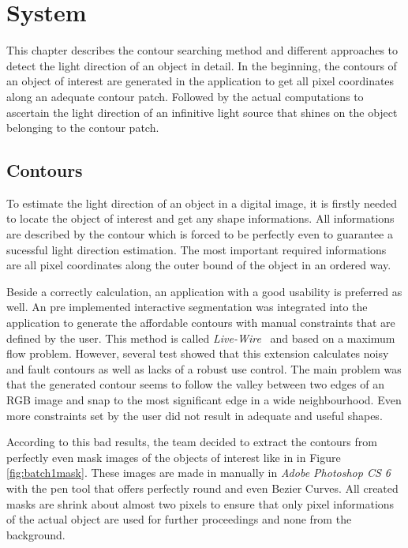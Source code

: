 \section{System}\label{sec:System}
This chapter describes the contour searching method and different approaches to detect the light direction of an object in detail. In the beginning, the contours of an object of interest are generated in the application to get all pixel coordinates along an adequate contour patch. Followed by the actual computations to ascertain the light direction of an infinitive light source that shines on the object belonging to the contour patch.

\subsection{Contours}\label{sec:contours}
To estimate the light direction of an object in a digital image, it is firstly needed to locate the object of interest and get any shape informations. All informations are described by the contour which is forced to be perfectly even to guarantee a sucessful light direction estimation. The most important required informations are all pixel coordinates along the outer bound of the object in an ordered way. 

Beside a correctly calculation, an application with a good usability is preferred as well. 
An pre implemented interactive segmentation \cite{website:LiveWire} was integrated into the application to generate the affordable contours with manual constraints that are defined by the user. This method is called \textit{Live-Wire}~\cite{BARRETT1997331} and based on a maximum flow problem. However, several test showed that this extension calculates noisy and fault contours as well as lacks of a robust use control. The main problem was that the generated contour seems to follow the valley between two edges of an RGB image and snap to the most significant edge in a wide neighbourhood. Even more constraints set by the user did not result in adequate and useful shapes. 

According to this bad results, the team decided to extract the contours from perfectly even mask images of the objects of interest like in in Figure \ref{fig:batch1mask}. These images are made in manually in \textit{Adobe Photoshop CS 6} with the pen tool that offers perfectly round and even Bezier Curves. All created masks are shrink about almost two pixels to ensure that only pixel informations of the actual object are used for further proceedings and none from the background. 

